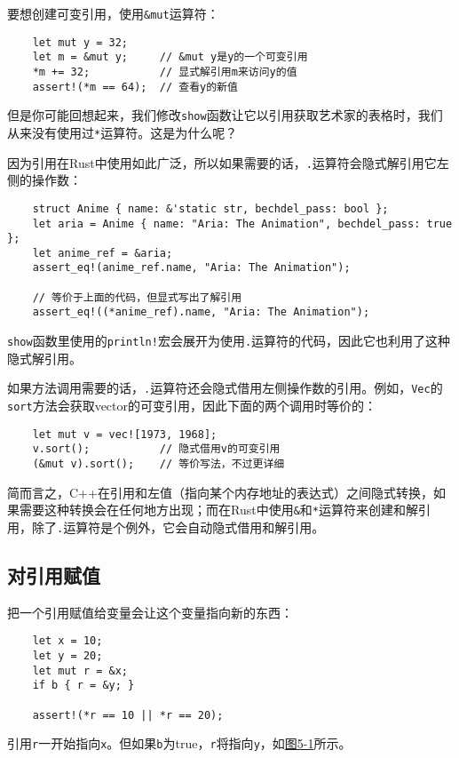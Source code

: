 要想创建可变引用，使用\texttt{\&mut}运算符：
\begin{verbatim}
    let mut y = 32;
    let m = &mut y;     // &mut y是y的一个可变引用
    *m += 32;           // 显式解引用m来访问y的值
    assert!(*m == 64);  // 查看y的新值
\end{verbatim}

但是你可能回想起来，我们修改\texttt{show}函数让它以引用获取艺术家的表格时，我们从来没有使用过\texttt{*}运算符。这是为什么呢？

因为引用在Rust中使用如此广泛，所以如果需要的话，\texttt{.}运算符会隐式解引用它左侧的操作数：
\begin{verbatim}
    struct Anime { name: &'static str, bechdel_pass: bool };
    let aria = Anime { name: "Aria: The Animation", bechdel_pass: true };
    let anime_ref = &aria;
    assert_eq!(anime_ref.name, "Aria: The Animation");

    // 等价于上面的代码，但显式写出了解引用
    assert_eq!((*anime_ref).name, "Aria: The Animation");
\end{verbatim}

\texttt{show}函数里使用的\texttt{println!}宏会展开为使用\texttt{.}运算符的代码，因此它也利用了这种隐式解引用。

如果方法调用需要的话，\texttt{.}运算符还会隐式借用左侧操作数的引用。例如，\texttt{Vec}的\texttt{sort}方法会获取vector的可变引用，因此下面的两个调用时等价的：
\begin{verbatim}
    let mut v = vec![1973, 1968];
    v.sort();           // 隐式借用v的可变引用
    (&mut v).sort();    // 等价写法，不过更详细
\end{verbatim}

简而言之，C++在引用和左值（指向某个内存地址的表达式）之间隐式转换，如果需要这种转换会在任何地方出现；而在Rust中使用\texttt{\&}和\texttt{*}运算符来创建和解引用，除了\texttt{.}运算符是个例外，它会自动隐式借用和解引用。

\subsection{对引用赋值}
把一个引用赋值给变量会让这个变量指向新的东西：
\begin{verbatim}
    let x = 10;
    let y = 20;
    let mut r = &x;
    if b { r = &y; }

    assert!(*r == 10 || *r == 20);
\end{verbatim}

引用\texttt{r}一开始指向\texttt{x}。但如果\texttt{b}为true，\texttt{r}将指向\texttt{y}，如\hyperref[f5-1]{图5-1}所示。

